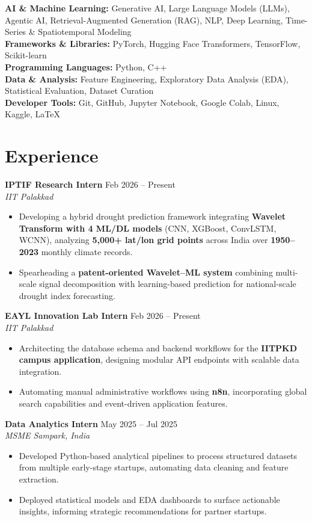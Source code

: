 \documentclass[a4paper, 10.5pt]{article}
\newcommand{\entry}[3]{%
  \vspace{4pt}%
  \textbf{#1} \hfill \textcolor{subtext}{\small #3}\\[-2pt]
  \textit{\textcolor{subtext}{#2}}%
  \vspace{2pt}%
}
\begin{document}
\textbf{AI \& Machine Learning:} Generative AI, Large Language Models (LLMs), Agentic AI, Retrieval-Augmented Generation (RAG), NLP, Deep Learning, Time-Series \& Spatiotemporal Modeling\\[3pt]
\textbf{Frameworks \& Libraries:} PyTorch, Hugging Face Transformers, TensorFlow, Scikit-learn\\[3pt]
\textbf{Programming Languages:} Python, C++\\[3pt]
\textbf{Data \& Analysis:} Feature Engineering, Exploratory Data Analysis (EDA), Statistical Evaluation, Dataset Curation\\[3pt]
\textbf{Developer Tools:} Git, GitHub, Jupyter Notebook, Google Colab, Linux, Kaggle, LaTeX

\section{Experience}

\entry{IPTIF Research Intern}{IIT Palakkad}{Feb 2026 -- Present}
\begin{itemize}
  \item Developing a hybrid drought prediction framework integrating \textbf{Wavelet Transform with 4 ML/DL models} (CNN, XGBoost, ConvLSTM, WCNN), analyzing \textbf{5,000+ lat/lon grid points} across India over \textbf{1950--2023} monthly climate records.
  \item Spearheading a \textbf{patent-oriented Wavelet--ML system} combining multi-scale signal decomposition with learning-based prediction for national-scale drought index forecasting.
\end{itemize}

\entry{EAYL Innovation Lab Intern}{IIT Palakkad}{Feb 2026 -- Present}
\begin{itemize}
  \item Architecting the database schema and backend workflows for the \textbf{IITPKD campus application}, designing modular API endpoints with scalable data integration.
  \item Automating manual administrative workflows using \textbf{n8n}, incorporating global search capabilities and event-driven application features.
\end{itemize}

\entry{Data Analytics Intern}{MSME Sampark, India}{May 2025 -- Jul 2025}
\begin{itemize}
  \item Developed Python-based analytical pipelines to process structured datasets from multiple early-stage startups, automating data cleaning and feature extraction.
  \item Deployed statistical models and EDA dashboards to surface actionable insights, informing strategic recommendations for partner startups.
\end{itemize}
\end{document}
